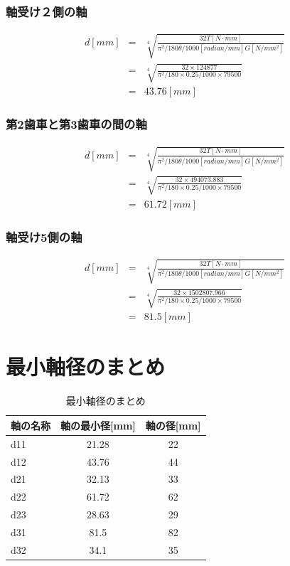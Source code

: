 \subsubsection{軸受け２側の軸}
\begin{eqnarray}
d[mm]&=& \sqrt[4]{\frac{32T[N \cdot mm]}{\pi^2/180 \bar{\theta}/1000[radian/mm] G[N/mm^2]}}\\
     &=& \sqrt[4]{\frac{32\times 124877 }{\pi^2/180 \times 0.25/1000 \times 79500}}\\
     &=& 43.76[mm]
\end{eqnarray}


\subsubsection{第2歯車と第3歯車の間の軸}
\begin{eqnarray}
d[mm]&=&\sqrt[4]{\frac{32T[N \cdot mm]}{\pi^2/180 \bar{\theta}/1000[radian/mm] G[N/mm^2]}}\\
     &=&\sqrt[4]{\frac{32\times 494073.883 }{\pi^2/180 \times 0.25/1000 \times 79500}}\\
     &=& 61.72[mm]
\end{eqnarray}


\subsubsection{軸受け5側の軸}
\begin{eqnarray}
d[mm]&=& \sqrt[4]{\frac{32T[N \cdot mm]}{\pi^2/180 \bar{\theta}/1000[radian/mm] G[N/mm^2]}}\\
     &=& \sqrt[4]{\frac{32\times 1502807.966 }{\pi^2/180 \times 0.25/1000 \times 79500}}\\
     &=& 81.5[mm]
\end{eqnarray}
\section{最小軸径のまとめ}
\begin{table}[htb]
\begin{center}
  \caption{最小軸径のまとめ}
  \begin{tabular}{|l||c|c|} \hline
軸の名称&軸の最小径[mm]&軸の径[mm]\\\hline\hline
d11&21.28&22\\
d12&43.76&44\\
d21&32.13&33\\
d22&61.72&62\\
d23&28.63&29\\
d31&81.5&82\\
d32&34.1&35\\
\hline
  \end{tabular}
\end{center}
\end{table}






